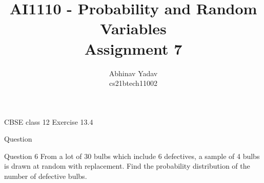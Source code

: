\documentclass{beamer}
\title{AI1110 - Probability and Random Variables \\
        Assignment 7}
\author{Abhinav Yadav \\ 
        cs21btech11002}
\begin{document}
    \maketitle

    \begin{frame}{CBSE class 12 Exercise 13.4}
        \begin{section}{Question}
            \begin{block}{Question 6}
                From a lot of 30 bulbs which include 6 defectives, a sample of 4 bulbs is drawn
                at random with replacement. Find the probability distribution of the number of
                defective bulbs.
            \end{block}
        \end{section}
    \end{frame}
\end{document}
